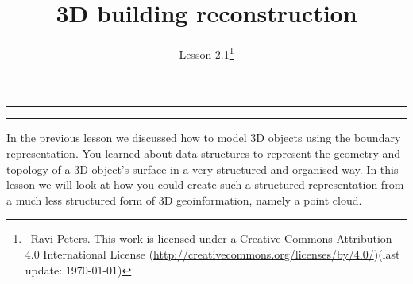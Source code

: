 
\newcommand{\lessonNumber}{Lesson 2.1}

\newcommand{\Orient}{O\textsc{rient}\xspace}
\newcommand{\Insphere}{I\textsc{n}S\textsc{phere}\xspace}


\newtheorem{definition}{Definition}



\title{3D building reconstruction}

\ohead*{\lessonNumber}
\titlehead{\thispagestyle{headings}}
\author{\lessonNumber\footnote{\ccbysa\ Ravi Peters. This work is licensed under a Creative Commons Attribution 4.0 International License (\url{http://creativecommons.org/licenses/by/4.0/})\newline(last update: \today)}}
\date{}

\pagestyle{scrheadings}

\maketitle

\noindent\rule{5cm}{0.4pt}
\tableofcontents
\noindent\rule{5cm}{0.4pt}
\vspace{5mm}

In the previous lesson we discussed how to model 3D objects using the boundary representation.
You learned about data structures to represent the geometry and topology of a 3D object's surface in a very structured and organised way.
In this lesson we will look at how you could create such a structured representation from a much less structured form of 3D geoinformation, namely a point cloud.

